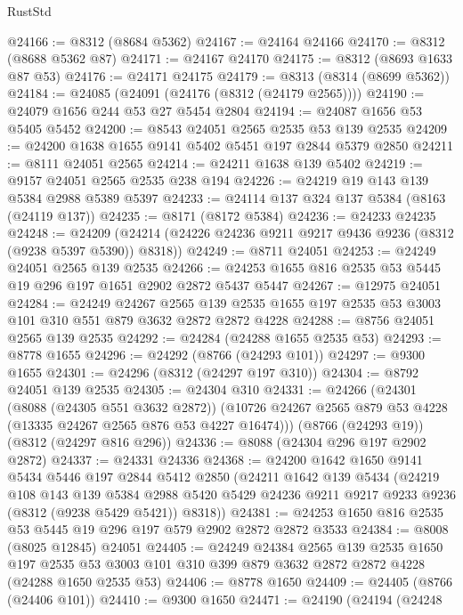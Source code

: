 \begin{lexlean}{RustStd}
\begin{coremodule}
@24166 := @8312 (@8684 @5362)
@24167 := @24164 @24166
@24170 := @8312 (@8688 @5362 @87)
@24171 := @24167 @24170
@24175 := @8312 (@8693 @1633 @87 @53)
@24176 := @24171 @24175
@24179 := @8313 (@8314 (@8699 @5362))
@24184 := @24085 (@24091 (@24176 (@8312 (@24179 @2565))))
@24190 := @24079 @1656 @244 @53 @27 @5454 @2804
@24194 := @24087 @1656 @53 @5405 @5452
@24200 := @8543 @24051 @2565 @2535 @53 @139 @2535
@24209 := @24200 @1638 @1655 @9141 @5402 @5451 @197 @2844 @5379 @2850
@24211 := @8111 @24051 @2565
@24214 := @24211 @1638 @139 @5402
@24219 := @9157 @24051 @2565 @2535 @238 @194
@24226 := @24219 @19 @143 @139 @5384 @2988 @5389 @5397
@24233 := @24114 @137 @324 @137 @5384 (@8163 (@24119 @137))
@24235 := @8171 (@8172 @5384)
@24236 := @24233 @24235
@24248 := @24209 (@24214 (@24226 @24236 @9211 @9217 @9436 @9236 (@8312 (@9238 @5397 @5390)) @8318))
@24249 := @8711 @24051
@24253 := @24249 @24051 @2565 @139 @2535
@24266 := @24253 @1655 @816 @2535 @53 @5445 @19 @296 @197 @1651 @2902 @2872 @5437 @5447
@24267 := @12975 @24051
@24284 := @24249
    @24267
    @2565
    @139
    @2535
    @1655
    @197
    @2535
    @53
    @3003
    @101
    @310
    @551
    @879
    @3632
    @2872
    @2872
    @4228
@24288 := @8756 @24051 @2565 @139 @2535
@24292 := @24284 (@24288 @1655 @2535 @53)
@24293 := @8778 @1655
@24296 := @24292 (@8766 (@24293 @101))
@24297 := @9300 @1655
@24301 := @24296 (@8312 (@24297 @197 @310))
@24304 := @8792 @24051 @139 @2535
@24305 := @24304 @310
@24331 := @24266
    (@24301
      (@8088 (@24305 @551 @3632 @2872))
      (@10726 @24267 @2565 @879 @53 @4228 (@13335 @24267 @2565 @876 @53 @4227 @16474)))
    (@8766 (@24293 @19))
    (@8312 (@24297 @816 @296))
@24336 := @8088 (@24304 @296 @197 @2902 @2872)
@24337 := @24331 @24336
@24368 := @24200
    @1642
    @1650
    @9141
    @5434
    @5446
    @197
    @2844
    @5412
    @2850
    (@24211
      @1642
      @139
      @5434
      (@24219
        @108
        @143
        @139
        @5384
        @2988
        @5420
        @5429
        @24236
        @9211
        @9217
        @9233
        @9236
        (@8312 (@9238 @5429 @5421))
        @8318))
@24381 := @24253 @1650 @816 @2535 @53 @5445 @19 @296 @197 @579 @2902 @2872 @2872 @3533
@24384 := @8008 (@8025 @12845) @24051
@24405 := @24249
    @24384
    @2565
    @139
    @2535
    @1650
    @197
    @2535
    @53
    @3003
    @101
    @310
    @399
    @879
    @3632
    @2872
    @2872
    @4228
    (@24288 @1650 @2535 @53)
@24406 := @8778 @1650
@24409 := @24405 (@8766 (@24406 @101))
@24410 := @9300 @1650
@24471 := @24190
    (@24194
      (@24248

\end{coremodule}
\end{lexlean}
